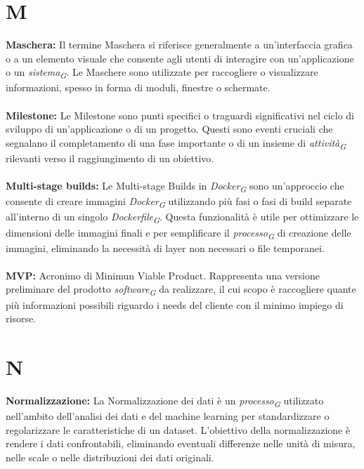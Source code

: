 \documentclass{article}
\begin{document}
\section*{M}
{}
\textbf{Maschera:} Il termine Maschera si riferisce generalmente a un'interfaccia grafica o a un elemento visuale che consente agli utenti di interagire con un'applicazione o un \textit{sistema}\textsubscript{\textit{G}}. Le Maschere sono utilizzate per raccogliere o visualizzare informazioni, spesso in forma di moduli, finestre o schermate.
\\
\\
\textbf{Milestone:} Le Milestone sono punti specifici o traguardi significativi nel ciclo di sviluppo di un'applicazione o di un progetto. Questi sono eventi cruciali che segnalano il completamento di una fase importante o di un insieme di \textit{attività}\textsubscript{\textit{G}} rilevanti verso il raggiungimento di un obiettivo.
\\
\\
\textbf{Multi-stage builds:} Le Multi-stage Builds in \textit{Docker}\textsubscript{\textit{G}} sono un'approccio che consente di creare immagini \textit{Docker}\textsubscript{\textit{G}} utilizzando più fasi o fasi di build separate all'interno di un singolo \textit{Dockerfile}\textsubscript{\textit{G}}. Questa funzionalità è utile per ottimizzare le dimensioni delle immagini finali e per semplificare il \textit{processo}\textsubscript{\textit{G}} di creazione delle immagini, eliminando la necessità di layer non necessari o file temporanei.
\\
\\
\textbf{MVP:} Acronimo di Minimun Viable Product. Rappresenta una versione preliminare del prodotto \textit{software}\textsubscript{\textit{G}} da realizzare, il cui scopo è raccogliere quante più informazioni possibili riguardo i needs del cliente con il minimo impiego di risorse.
\pagebreak
\section*{N}
{}
\textbf{Normalizzazione:} La Normalizzazione dei dati è un \textit{processo}\textsubscript{\textit{G}} utilizzato nell'ambito dell'analisi dei dati e del machine learning per standardizzare o regolarizzare le caratteristiche di un dataset. L'obiettivo della normalizzazione è rendere i dati confrontabili, eliminando eventuali differenze nelle unità di misura, nelle scale o nelle distribuzioni dei dati originali.
\pagebreak
\end{document}

